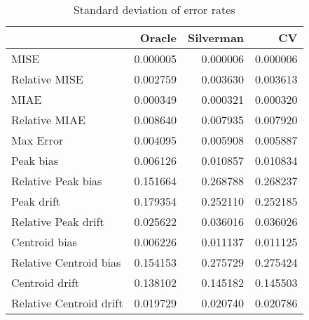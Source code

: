 \begin{table}[ht]
\centering
\begin{tabular}{lrrr}
  \hline
 & Oracle & Silverman & CV \\ 
  \hline
MISE & 0.000005 & 0.000006 & 0.000006 \\ 
  Relative MISE & 0.002759 & 0.003630 & 0.003613 \\ 
  MIAE & 0.000349 & 0.000321 & 0.000320 \\ 
  Relative MIAE & 0.008640 & 0.007935 & 0.007920 \\ 
  Max Error & 0.004095 & 0.005908 & 0.005887 \\ 
  Peak bias & 0.006126 & 0.010857 & 0.010834 \\ 
  Relative Peak bias & 0.151664 & 0.268788 & 0.268237 \\ 
  Peak drift & 0.179354 & 0.252110 & 0.252185 \\ 
  Relative Peak drift & 0.025622 & 0.036016 & 0.036026 \\ 
  Centroid bias & 0.006226 & 0.011137 & 0.011125 \\ 
  Relative Centroid bias & 0.154153 & 0.275729 & 0.275424 \\ 
  Centroid drift & 0.138102 & 0.145182 & 0.145503 \\ 
  Relative Centroid drift & 0.019729 & 0.020740 & 0.020786 \\ 
   \hline
\end{tabular}
\caption{Standard deviation of error rates} 
\label{tbl:stddev_error_rates}
\end{table}
